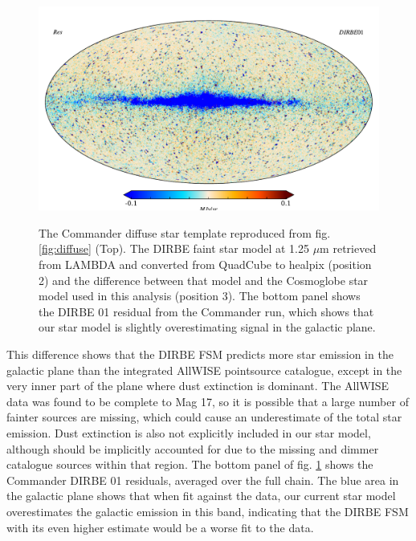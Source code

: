 \documentclass{aa}
\begin{document}
\begin{figure}
  \includegraphics[width=\columnwidth]{figs/diffuseTemplate/band01_res.pdf}\\
  \caption{The Commander diffuse star template reproduced from fig. \ref{fig:diffuse} (Top). The DIRBE faint star model at 1.25 $\mu$m retrieved from LAMBDA and converted from QuadCube to healpix (position 2) and the difference between that model and the Cosmoglobe star model used in this analysis (position 3). The bottom panel shows the DIRBE 01 residual from the Commander run, which shows that our star model is slightly overestimating signal in the galactic plane.}
  \label{fig:DIRBEfaint}
\end{figure}

This difference shows that the DIRBE FSM predicts more star emission in the galactic plane than the integrated AllWISE pointsource catalogue, except in the very inner part of the plane where dust extinction is dominant. The AllWISE data was found to be complete to Mag 17, so it is possible that a large number of fainter sources are missing, which could cause an underestimate of the total star emission. Dust extinction is also not explicitly included in our star model, although should be implicitly accounted for due to the missing and dimmer catalogue sources within that region. The bottom panel of fig. \ref{fig:DIRBEfaint} shows the Commander DIRBE 01 residuals, averaged over the full chain. The blue area in the galactic plane shows that when fit against the data, our current star model overestimates the galactic emission in this band, indicating that the DIRBE FSM with its even higher estimate would be a worse fit to the data. 
\end{document}
